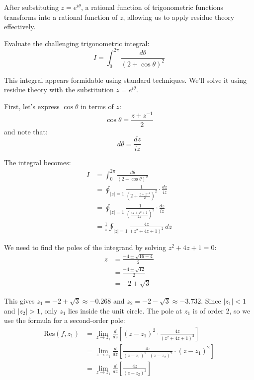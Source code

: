 \noindent After substituting $z = e^{i\theta}$, a rational function of trigonometric functions transforms into a rational function of $z$, allowing us to apply residue theory effectively.

\exampleline
\begin{example}
Evaluate the challenging trigonometric integral:
\[
I = \int_{0}^{2\pi} \frac{d\theta}{(2 + \cos\theta)^2}
\]

\begin{solution}
\noindent This integral appears formidable using standard techniques. We'll solve it using residue theory with the substitution $z = e^{i\theta}$.

\noindent First, let's express $\cos\theta$ in terms of $z$:
\[
\cos\theta = \frac{z + z^{-1}}{2}
\]
and note that:
\[
d\theta = \frac{dz}{iz}
\]

\noindent The integral becomes:
\begin{align*}
I &= \int_{0}^{2\pi} \frac{d\theta}{(2 + \cos\theta)^2} \\
&= \oint_{|z|=1} \frac{1}{\left(2 + \frac{z + z^{-1}}{2}\right)^2} \cdot \frac{dz}{iz} \\
&= \oint_{|z|=1} \frac{1}{\left(\frac{4z + z^2 + 1}{2z}\right)^2} \cdot \frac{dz}{iz} \\
&= \frac{1}{i} \oint_{|z|=1} \frac{4z}{\left(z^2 + 4z + 1\right)^2} \, dz
\end{align*}

\noindent We need to find the poles of the integrand by solving $z^2 + 4z + 1 = 0$:
\begin{align*}
z &= \frac{-4 \pm \sqrt{16 - 4}}{2} \\
&= \frac{-4 \pm \sqrt{12}}{2} \\
&= -2 \pm \sqrt{3}
\end{align*}

\noindent This gives $z_1 = -2 + \sqrt{3} \approx -0.268$ and $z_2 = -2 - \sqrt{3} \approx -3.732$. Since $|z_1| < 1$ and $|z_2| > 1$, only $z_1$ lies inside the unit circle. The pole at $z_1$ is of order 2, so we use the formula for a second-order pole:
\begin{align*}
\text{Res}(f, z_1) &= \lim_{z \to z_1} \frac{d}{dz}\left[(z - z_1)^2 \cdot \frac{4z}{\left(z^2 + 4z + 1\right)^2}\right] \\
&= \lim_{z \to z_1} \frac{d}{dz}\left[\frac{4z}{(z - z_1)^2 \cdot (z - z_2)^2} \cdot (z - z_1)^2\right] \\
&= \lim_{z \to z_1} \frac{d}{dz}\left[\frac{4z}{(z - z_2)^2}\right]
\end{align*}


\end{solution}
\end{example}
